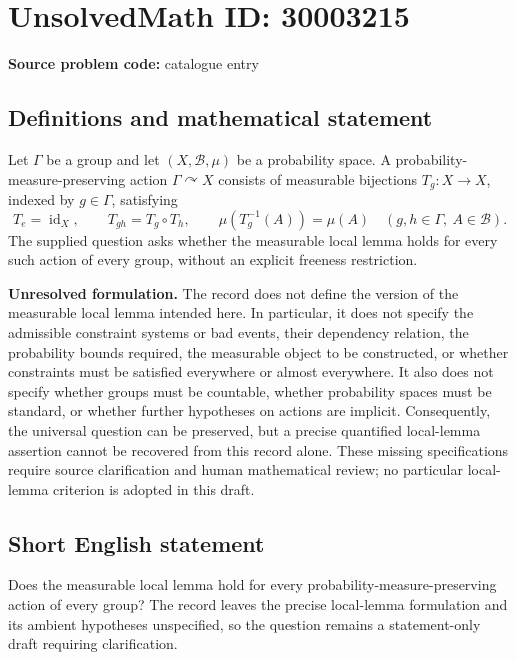 \documentclass[11pt]{article}
\begin{document}
\section*{UnsolvedMath ID: 30003215}
\textbf{Source problem code:} catalogue entry
\subsection{Definitions and mathematical statement}
Let \(\Gamma\) be a group and let \((X,\mathcal{B},\mu)\) be a probability space. A probability-measure-preserving action \(\Gamma\curvearrowright X\) consists of measurable bijections \(T_g:X\to X\), indexed by \(g\in\Gamma\), satisfying
\[
T_e=\operatorname{id}_X,\qquad T_{gh}=T_g\circ T_h,\qquad
\mu(T_g^{-1}(A))=\mu(A)
\quad(g,h\in\Gamma,\ A\in\mathcal{B}).
\]
The supplied question asks whether the measurable local lemma holds for every such action of every group, without an explicit freeness restriction.

\textbf{Unresolved formulation.} The record does not define the version of the measurable local lemma intended here. In particular, it does not specify the admissible constraint systems or bad events, their dependency relation, the probability bounds required, the measurable object to be constructed, or whether constraints must be satisfied everywhere or almost everywhere. It also does not specify whether groups must be countable, whether probability spaces must be standard, or whether further hypotheses on actions are implicit. Consequently, the universal question can be preserved, but a precise quantified local-lemma assertion cannot be recovered from this record alone. These missing specifications require source clarification and human mathematical review; no particular local-lemma criterion is adopted in this draft.
\subsection{Short English statement}
Does the measurable local lemma hold for every probability-measure-preserving action of every group? The record leaves the precise local-lemma formulation and its ambient hypotheses unspecified, so the question remains a statement-only draft requiring clarification.
\end{document}
